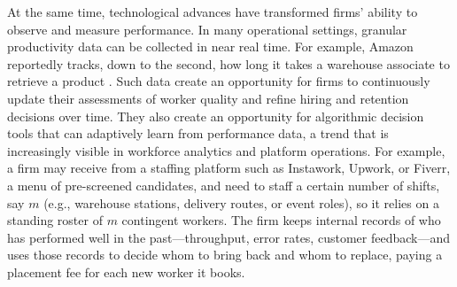 \documentclass[opre,blindrev]{informs3}
\begin{document}
At the same time, technological advances have transformed firms' ability to observe and measure performance. In many operational settings, granular productivity data can be collected in near real time. For example, Amazon reportedly tracks, down to the second, how long it takes a warehouse associate to retrieve a product \citep{Vincent2015}. Such data create an opportunity for firms to continuously update their assessments of worker quality and refine hiring and retention decisions over time. They also create an opportunity for algorithmic decision tools that can adaptively learn from performance data, a trend that is increasingly visible in workforce analytics and platform operations. For example, a firm may receive from a staffing platform such as Instawork, Upwork, or Fiverr, a menu of pre-screened candidates, and need to staff a certain number of shifts, say \(m\) (e.g., warehouse stations, delivery routes, or event roles), so it relies on a standing roster of \(m\) contingent workers. The firm keeps internal records of who has performed well in the past---throughput, error rates, customer feedback---and uses those records to decide whom to bring back and whom to replace, paying a placement fee for each new worker it books.

\end{document}
